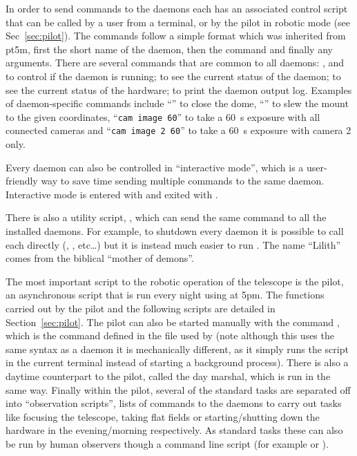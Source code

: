 \begin{colsection}
\begin{colsection}
In order to send commands to the daemons each has an associated control script that can be called by a user from a terminal, or by the pilot in robotic mode (see Sec~\ref{sec:pilot}). The commands follow a simple format which was inherited from \gls{pt5m}, first the short name of the daemon, then the command and finally any arguments. There are several commands that are common to all daemons: ,  and  to control if the daemon is running;  to see the current status of the daemon;  to see the current status of the hardware;  to print the daemon output log. Examples of daemon-specific commands include ``'' to close the dome, ``'' to slew the mount to the given coordinates, ``\texttt{cam~image~60}'' to take a \SI{60}{\second} exposure with all connected cameras and ``\texttt{cam~image~2~60}'' to take a \SI{60}{\second} exposure with camera 2 only.

Every daemon can also be controlled in ``interactive mode'', which is a user-friendly way to save time sending multiple commands to the same daemon. Interactive mode is entered with  and exited with .

There is also a utility script, , which can send the same command to all the installed daemons. For example, to shutdown every daemon it is possible to call each directly (, ,  etc\ldots) but it is instead much easier to run . The name ``Lilith'' comes from the biblical ``mother of demons''.

The most important script to the robotic operation of the telescope is the pilot, an asynchronous script that is run every night using  at 5pm. The functions carried out by the pilot and the following scripts are detailed in Section~\ref{sec:pilot}. The pilot can also be started manually with the command , which is the command defined in the  file used by  (note although this uses the same syntax as a daemon it is mechanically different, as it simply runs the script in the current terminal instead of starting a background process). There is also a daytime counterpart to the pilot, called the day marshal, which is run in the same way. Finally within the pilot, several of the standard tasks are separated off into ``observation scripts'', lists of commands to the daemons to carry out tasks like focusing the telescope, taking flat fields or starting/shutting down the hardware in the evening/morning respectively. As standard tasks these can also be run by human observers though a command line script  (for example  or ).


\end{colsection}
\end{colsection}
